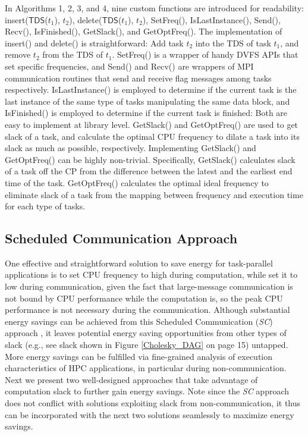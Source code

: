 \documentclass[12pt]{elsarticle}
\begin{document}
In Algorithms 1, 2, 3, and 4, nine custom functions are introduced for readability: \textsf{insert($\mathsf{TDS}$($t_1$), $t_2$)}, \textsf{delete($\mathsf{TDS}$($t_1$), $t_2$)}, \textsf{SetFreq()}, \textsf{IsLastInstance()}, \textsf{Send()}, \textsf{Recv()}, \textsf{IsFinished()}, \textsf{GetSlack()}, and \textsf{GetOptFreq()}. The implementation of \textsf{insert()} and \textsf{delete()} is straightforward: Add task $t_2$ into the TDS of task $t_1$, and remove $t_2$ from the TDS of $t_1$. \textsf{SetFreq()} is a wrapper of handy DVFS APIs that set specific frequencies, and \textsf{Send()} and \textsf{Recv()} are wrappers of MPI communication routines that send and receive flag messages among tasks respectively. \textsf{IsLastInstance()} is employed to determine if the current task is the last instance of the same type of tasks manipulating the same data block, and \textsf{IsFinished()} is employed to determine if the current task is finished: Both are easy to implement at library level. \textsf{GetSlack()} and \textsf{GetOptFreq()} are used to get slack of a task, and calculate the optimal CPU frequency to dilate a task into its slack as much as possible, respectively. Implementing \textsf{GetSlack()} and \textsf{GetOptFreq()} can be highly non-trivial. Specifically, \textsf{GetSlack()} calculates slack of a task off the CP from the difference between the latest and the earliest end time of the task. \textsf{GetOptFreq()} calculates the optimal ideal frequency to eliminate slack of a task from the mapping between frequency and execution time for each type of tasks.

\subsection{Scheduled Communication Approach}

One effective and straightforward solution to save energy for task-parallel applications is to set CPU frequency to high during computation, while set it to low during communication, given the fact that large-message communication is not bound by CPU performance while the computation is, so the peak CPU performance is not necessary during the communication. Although substantial energy savings can be achieved from this Scheduled Communication (\emph{SC}) approach \cite{sc06} \cite{sc07}, it leaves potential energy saving opportunities from other types of slack (e.g., see slack shown in Figure \ref{Cholesky_DAG} on page 15) untapped. More energy savings can be fulfilled via fine-grained analysis of execution characteristics of HPC applications, in particular during non-communication. Next we present two well-designed approaches that take advantage of computation slack to further gain energy savings. Note since the \emph{SC} approach does not conflict with solutions exploiting slack from non-communication, it thus can be incorporated with the next two solutions seamlessly to maximize energy savings.
\end{document}
